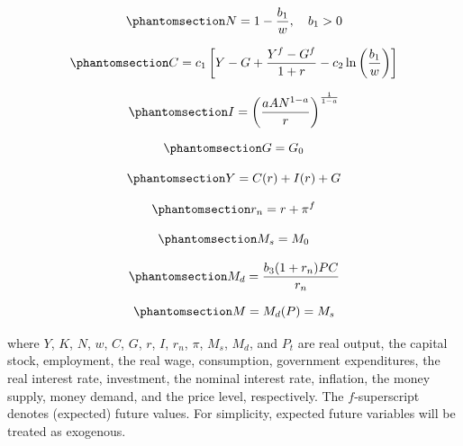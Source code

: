 \documentclass[
  letterpaper,
  DIV=11,
  numbers=noendperiod]{scrreprt}
\begin{document}
\begin{equation}\phantomsection\label{eq-N_NC}{
N= 1-\frac{b_1}{w}, \quad b_1>0
}\end{equation}

\begin{equation}\phantomsection\label{eq-C_NC}{
C=c_1\left[Y- G +\frac{Y^f-G^f}{1+r} -c_2\ln\left(\frac{b_1}{w}\right)\right]
}\end{equation}

\begin{equation}\phantomsection\label{eq-I_NC}{
I =\left(\frac{aAN^{1-a}}{r}\right)^{\frac{1}{1-a}}
}\end{equation}

\begin{equation}\phantomsection\label{eq-G_NC}{
G= G_0
}\end{equation}

\begin{equation}\phantomsection\label{eq-Y_eq_NC}{
Y= C(r) + I(r) + G
}\end{equation}

\begin{equation}\phantomsection\label{eq-rn_NC}{
r_n= r + \pi^f
}\end{equation}

\begin{equation}\phantomsection\label{eq-MS_NC}{
M_s=M_0
}\end{equation}

\begin{equation}\phantomsection\label{eq-MD_NC}{
M_d=\frac{b_3(1+r_n)PC}{r_n}
}\end{equation}

\begin{equation}\phantomsection\label{eq-M_eq_NC}{
M = M_d(P)= M_s
}\end{equation}

where \(Y\), \(K\), \(N\), \(w\), \(C\), \(G\), \(r\), \(I\), \(r_n\),
\(\pi\), \(M_s\), \(M_d\), and \(P_t\) are real output, the capital
stock, employment, the real wage, consumption, government expenditures,
the real interest rate, investment, the nominal interest rate,
inflation, the money supply, money demand, and the price level,
respectively. The \(f\)-superscript denotes (expected) future values.
For simplicity, expected future variables will be treated as exogenous.
\end{document}
